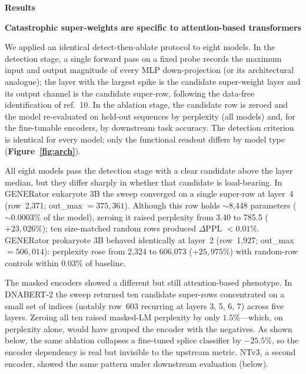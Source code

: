 \documentclass[11pt]{article}
\begin{document}
\textbf{Results}

\medskip
\noindent\textbf{Catastrophic super-weights are specific to
attention-based transformers}

We applied an identical detect-then-ablate protocol to eight models. In
the detection stage, a single forward pass on a fixed probe records the
maximum input and output magnitude of every MLP down-projection (or its
architectural analogue); the layer with the largest spike is the
candidate super-weight layer and its output channel is the candidate
super-row, following the data-free identification of
ref.~10. In the ablation stage, the candidate row is zeroed and the
model re-evaluated on held-out sequences by perplexity (all models) and,
for the fine-tunable encoders, by downstream task accuracy. The
detection criterion is identical for every model; only the functional
readout differs by model type (\textbf{Figure~\ref{fig:arch}}).

All eight models pass the detection stage with a clear candidate above
the layer median, but they differ sharply in whether that candidate is
load-bearing. In GENERator eukaryote 3B the sweep converged on a single
super-row at layer~4 (row~2{,}371; out\_max $= 375{,}361$). Although
this row holds $\sim$8{,}448 parameters ($\sim$0.0003\% of the model),
zeroing it raised perplexity from 3.40 to 785.5 ($+23{,}026\%$); ten
size-matched random rows produced $\Delta$PPL $< 0.01\%$. GENERator
prokaryote 3B behaved identically at layer~2 (row~1{,}927;
out\_max $= 506{,}014$): perplexity rose from 2{,}324 to 606{,}073
($+25{,}975\%$) with random-row controls within 0.03\% of baseline.

The masked encoders showed a different but still attention-based
phenotype. In DNABERT-2 the sweep returned ten candidate super-rows
concentrated on a small set of indices (notably row~603 recurring at
layers 3, 5, 6, 7) across five layers. Zeroing all ten raised masked-LM
perplexity by only $1.5\%$---which, on perplexity alone, would have
grouped the encoder with the negatives. As shown below, the same
ablation collapses a fine-tuned splice classifier by $-25.5\%$, so the
encoder dependency is real but invisible to the upstream metric. NTv3,
a second encoder, showed the same pattern under downstream evaluation
(below).
\end{document}
